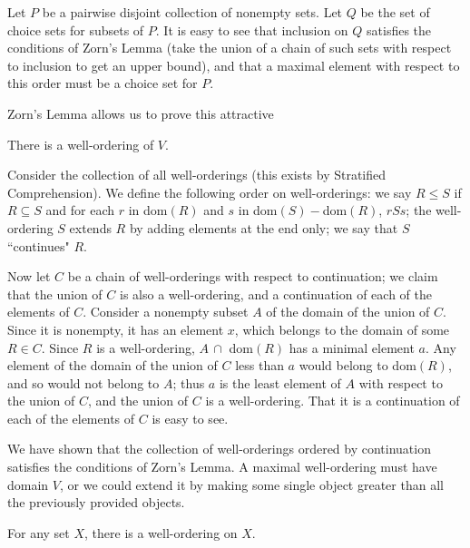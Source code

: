 \preuve Let $P$ be a pairwise disjoint collection of nonempty
sets.  Let $Q$ be the set of choice sets for subsets of $P$.  It
is easy to see that inclusion on $Q$ satisfies the conditions
of Zorn's Lemma (take the union of a chain of such sets with
respect to inclusion to get an upper bound), and that a
maximal element with respect to this order must be a choice set for $P$.
\finpreuve





Zorn's Lemma allows us to prove this attractive

\begin{thm}
 There is a well-ordering of $V$.
\end{thm}

\preuve Consider the collection of all well-orderings
(this exists by Stratified Comprehension).  We define the following order on well-orderings: we say $R \leq S$
if $R \subseteq S$ and for each $r$ in dom$(R)$ and $s$ in dom$(S)
-$dom$(R)$, $r S s$; the well-ordering $S$ extends $R$ by adding
elements at the end only; we say that $S$ ``continues" $R$.  

Now let
$C$ be a chain of well-orderings with respect to continuation; we
claim that the union of $C$ is also a
well-ordering, and a continuation of each of the
elements of $C$.    Consider a nonempty subset $A$ of
the domain of the union of $C$.  Since it is nonempty, it has an
element $x$, which belongs to the domain of some $R \in C$.  Since $R$
is a well-ordering, $A\, \cap $ dom$ (R)$ has a minimal element $a$.  Any
element of the domain of the union of $C$ less than $a$ would belong
to dom$ (R)$, and so would not belong to $A$; thus $a$ is the least
element of $A$ with respect to the union of $C$, and the union of $C$
is a well-ordering.  That it is a continuation of each of the elements
of $C$ is easy to see.

We have shown that the collection of well-orderings
ordered by continuation satisfies the conditions of Zorn's Lemma.  A maximal well-ordering must have domain $V$, or we
could extend it by making some single object greater than all the previously
provided objects.
\finpreuve

\begin{cor}
 For any set $X$, there is a well-ordering on $X$.
\end{cor}


